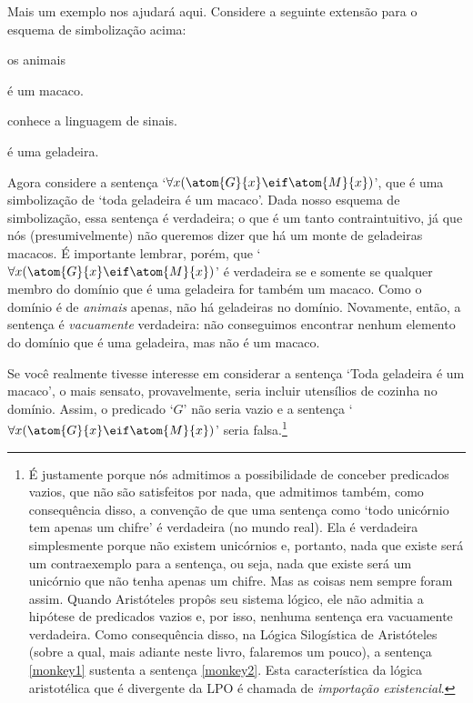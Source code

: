 Mais um exemplo nos ajudará aqui.
Considere a seguinte extensão para o esquema de simbolização acima:
		\begin{center}
		\begin{ekey}
			\item[\text{domínio}] os animais
			\item[\atom{M}{x}]  é um macaco.
			\item[\atom{L}{x}]  conhece a linguagem de sinais.
			\item[\atom{G}{x}]  é uma geladeira.
		\end{ekey}
		\end{center}
Agora considere a sentença `$\forall x(\atom{G}{x} \eif \atom{M}{x})$', que é uma simbolização de `toda geladeira é um macaco'.
Dada nosso esquema de simbolização, essa sentença é verdadeira; o que é um tanto contraintuitivo, já que nós (presumivelmente) não queremos dizer que há um monte de geladeiras macacos.
É importante lembrar, porém, que `$\forall x(\atom{G}{x} \eif \atom{M}{x})$' é verdadeira se e somente se qualquer membro do domínio que é uma geladeira for também um macaco.
Como o domínio é de \emph{animais} apenas, não há geladeiras no domínio. Novamente, então, a sentença é \emph{vacuamente} verdadeira:
não conseguimos encontrar nenhum elemento do domínio que é uma geladeira, mas não é um macaco. 

Se você realmente tivesse interesse em considerar a sentença `Toda geladeira é um macaco', o mais sensato, provavelmente, seria incluir utensílios de cozinha no domínio.
Assim, o predicado `$G$' não seria vazio e a sentença `$\forall x(\atom{G}{x} \eif \atom{M}{x})$' seria falsa.\footnote{
			É justamente porque nós admitimos a possibilidade de conceber predicados vazios, que não são satisfeitos por nada, que admitimos também, como consequência disso,  a convenção de que uma sentença como `todo unicórnio tem apenas um chifre' é verdadeira (no mundo real).
			Ela é verdadeira simplesmente porque não existem unicórnios e, portanto, nada que existe será um contraexemplo para a sentença, ou seja, nada que existe será um unicórnio que não tenha apenas um chifre.
			Mas as coisas nem sempre foram assim.
			Quando Aristóteles propôs seu sistema lógico, ele não admitia a hipótese de predicados vazios e, por isso, nenhuma sentença era vacuamente verdadeira.
			Como consequência disso, na Lógica Silogística de Aristóteles (sobre a qual, mais adiante neste livro, falaremos um pouco), a sentença \ref{monkey1} sustenta a sentença \ref{monkey2}.
			Esta característica da lógica aristotélica que é divergente da LPO é chamada de \emph{importação existencial}.}


